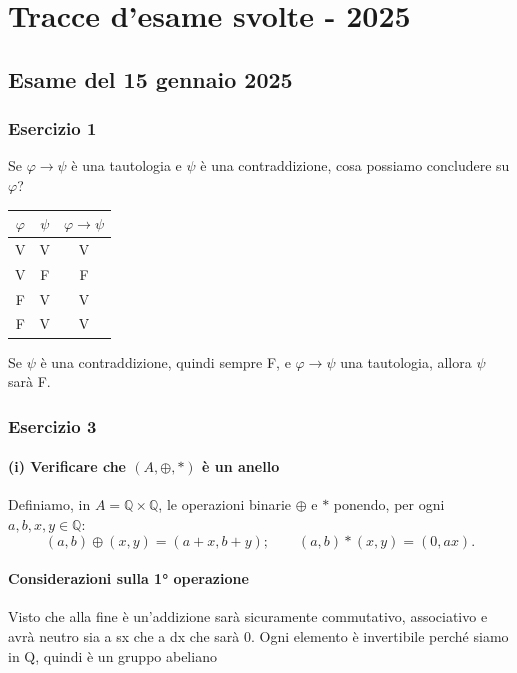 \chapter{Tracce d'esame svolte - 2025}


\section{Esame del 15 gennaio 2025}

\subsection*{Esercizio 1}

Se $\varphi \to \psi$ è una tautologia e $\psi$ è una contraddizione, cosa possiamo concludere su $\varphi$?

\begin{center}
\begin{tabular}{c|c|c}
$\varphi$ & $\psi$ & $\varphi \to \psi$ \\
\hline
V & V & V \\
V & F & F \\
F & V & V \\
F & V & V
\end{tabular}
\end{center}

Se $\psi$ è una contraddizione, quindi sempre F, e $\varphi \to \psi$ una tautologia, allora $\psi$ sarà F.

\subsection*{Esercizio 3}

\subsubsection*{(i) Verificare che $(A, \oplus, *)$ è un anello}

Definiamo, in $A = \mathbb{Q} \times \mathbb{Q}$, le operazioni binarie $\oplus$ e $*$ ponendo, per ogni $a, b, x, y \in \mathbb{Q}$:
$$(a,b) \oplus (x,y) = (a+x, b+y); \qquad (a,b) * (x,y) = (0, ax).$$

\subsubsection*{Considerazioni sulla 1° operazione}

Visto che alla fine è un'addizione sarà sicuramente commutativo, associativo e avrà neutro sia a sx che a dx che sarà 0. Ogni elemento è invertibile perché siamo in Q, quindi è un gruppo abeliano

